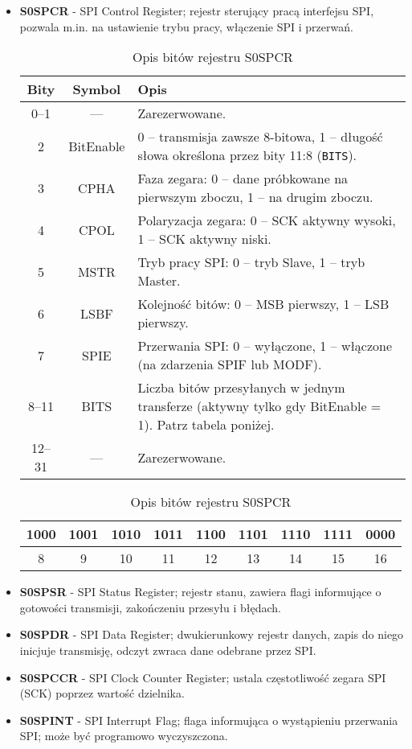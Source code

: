 \begin{itemize}
    \item \textbf{S0SPCR} - SPI Control Register; rejestr sterujący pracą interfejsu SPI, pozwala m.in. na ustawienie trybu pracy, włączenie SPI i przerwań.
\begin{table}[H]
\centering
\caption{Opis bitów rejestru S0SPCR}
\vspace{0.5em}
\renewcommand{\arraystretch}{1.2}
\begin{tabular}{|c|c|p{9.5cm}|}
\hline
\textbf{Bity} & \textbf{Symbol} & \textbf{Opis} \\
\hline
0–1     & —            & Zarezerwowane. \\
\hline
2       &BitEnable  & 0 – transmisja zawsze 8-bitowa, 1 – długość słowa określona przez bity 11:8 (\texttt{BITS}). \\
\hline
3       &CPHA     & Faza zegara: 0 – dane próbkowane na pierwszym zboczu, 1 – na drugim zboczu. \\
\hline
4       & CPOL       & Polaryzacja zegara: 0 – SCK aktywny wysoki, 1 – SCK aktywny niski. \\
\hline
5       & MSTR       & Tryb pracy SPI: 0 – tryb Slave, 1 – tryb Master. \\
\hline
6       & LSBF       & Kolejność bitów: 0 – MSB pierwszy, 1 – LSB pierwszy. \\
\hline
7       & SPIE       & Przerwania SPI: 0 – wyłączone, 1 – włączone (na zdarzenia SPIF lub MODF). \\
\hline
8–11    & BITS       & Liczba bitów przesyłanych w jednym transferze (aktywny tylko gdy BitEnable = 1). Patrz tabela poniżej. \\
\hline
12–31   & —            & Zarezerwowane. \\
\hline
\end{tabular}

\vspace{1em}

\begin{tabular}{|c|c|c|c|c|c|c|c|c|}
\hline
1000 & 1001 & 1010 & 1011 & 1100 & 1101 & 1110 & 1111 & 0000\\
\hline
8    & 9    & 10   & 11   & 12   & 13   & 14   & 15 & 16\\
\hline
\end{tabular}
\end{table}

    \item \textbf{S0SPSR} - SPI Status Register; rejestr stanu, zawiera flagi informujące o gotowości transmisji, zakończeniu przesyłu i błędach.
    \item \textbf{S0SPDR} - SPI Data Register; dwukierunkowy rejestr danych, zapis do niego inicjuje transmisję, odczyt zwraca dane odebrane przez SPI.
    \item \textbf{S0SPCCR} - SPI Clock Counter Register; ustala częstotliwość zegara SPI (SCK) poprzez wartość dzielnika.
    \item \textbf{S0SPINT} - SPI Interrupt Flag; flaga informująca o wystąpieniu przerwania SPI; może być programowo wyczyszczona.
\end{itemize}